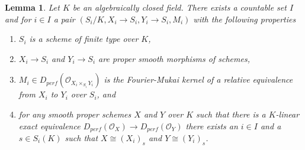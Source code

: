 \documentclass{stacks-project}
\theoremstyle{plain}
\newtheorem{lemma}[subsection]{Lemma}
\theoremstyle{definition}
\theoremstyle{remark}
\numberwithin{equation}{subsection}
\begin{document}
\begin{lemma}
\label{lemma-countable-equivs}
Let $K$ be an algebraically closed field. There exists a countable set $I$
and for $i \in I$ a pair $(S_i/K, X_i \to S_i, Y_i \to S_i, M_i)$
with the following properties
\begin{enumerate}
\item $S_i$ is a scheme of finite type over $K$,
\item $X_i \to S_i$ and $Y_i \to S_i$ are proper smooth
morphisms of schemes,
\item $M_i \in D_{perf}(\mathcal{O}_{X_i \times_{S_i} Y_i})$
is the Fourier-Mukai kernel of a relative equivalence from
$X_i$ to $Y_i$ over $S_i$, and
\item for any smooth proper schemes $X$ and $Y$ over $K$
such that there is a $K$-linear exact equivalence
$D_{perf}(\mathcal{O}_X) \to D_{perf}(\mathcal{O}_Y)$
there exists an $i \in I$ and a $s \in S_i(K)$
such that $X \cong (X_i)_s$ and $Y \cong (Y_i)_s$.
\end{enumerate}
\end{lemma}
\end{document}
